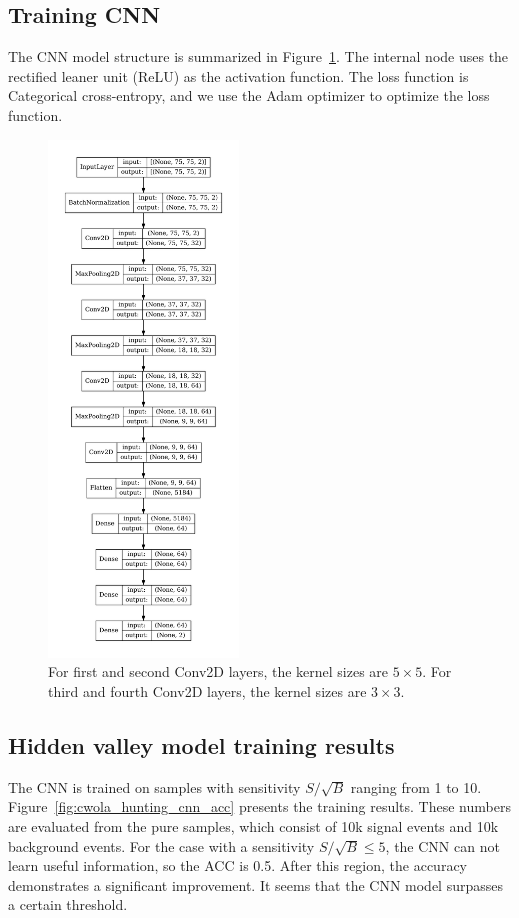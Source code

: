 \documentclass[12pt]{article}
\begin{document}
	\subsection{Training CNN}%
	\label{sub:training_cnn}
		The CNN model structure is summarized in Figure~\ref{fig:cnn_model_structure}. The internal node uses the rectified leaner unit (ReLU) as the activation function. The loss function is Categorical cross-entropy, and we use the Adam optimizer to optimize the loss function.
		\begin{figure}[htpb]
			\centering
			\includegraphics[width=0.45\textwidth]{CNN_model_structure.pdf}
			\caption{For first and second Conv2D layers, the kernel sizes are $5 \times 5$. For third and fourth Conv2D layers, the kernel sizes are $3 \times 3$.}
			\label{fig:cnn_model_structure}
		\end{figure}
	\subsection{Hidden valley model training results}%
	\label{sub:hidden_valley_model_training_results}
		The CNN is trained on samples with sensitivity $S / \sqrt{B}$ ranging from 1 to 10. Figure~\ref{fig:cwola_hunting_cnn_acc} presents the training results. These numbers are evaluated from the pure samples, which consist of 10k signal events and 10k background events. For the case with a sensitivity $S / \sqrt{B} \le  5$, the CNN can not learn useful information, so the ACC is 0.5. After this region, the accuracy demonstrates a significant improvement. It seems that the CNN model surpasses a certain threshold.
\end{document}
